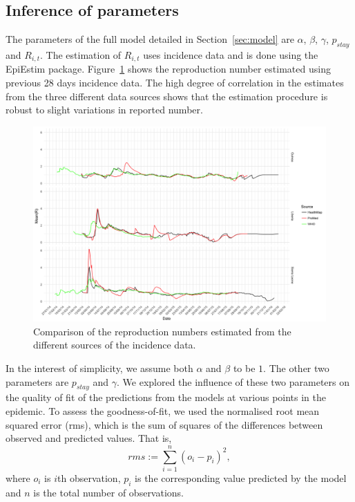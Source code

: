 \documentclass[11pt,]{article}
\begin{document}
\subsection{Inference of parameters}

The parameters of the full model detailed in Section~\ref{sec:model} are
$\alpha$, $\beta$, $\gamma$, $p_{stay}$ and $R_{i, t}$. The
estimation of $R_{i, t}$ uses incidence data and is done using the
EpiEstim package. Figure~\ref{fig:r_comp} shows the
reproduction number estimated using previous 28 days incidence
data. The high degree of correlation in the estimates from the three
different data sources shows that the estimation procedure is robust
to slight variations in reported number.


\begin{figure}
  \centering
  \includegraphics[width=\textwidth]{ms6-figures/who_vs_hm_vs_pm-R}
  \caption{Comparison of the reproduction numbers estimated from
        the different sources of the incidence data.}
  \label{fig:r_comp}
\end{figure}


In the interest of simplicity, we assume both
$\alpha$ and $\beta$ to be $1$. The other two parameters are
$p_{stay}$ and $\gamma$. We explored the influence of these two
parameters on the quality of fit of the predictions from the models at various points in the
epidemic. To assess the goodness-of-fit, we used the normalised root mean squared
error (rms), which is the sum of squares of the differences between
observed and predicted values. That is, 
\[ rms := \sum_{i = 1}^n{\left(o_i - p_i\right)^2},\]
where $o_i$ is $i$th observation, $p_i$ is the corresponding value
predicted by the model and $n$ is the total number of observations.
\end{document}

